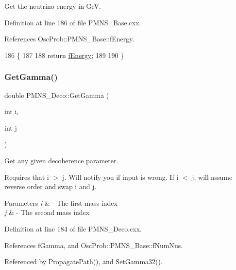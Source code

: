 Get the neutrino energy in GeV. 

Definition at line 186 of file P\+M\+N\+S\+\_\+\+Base.\+cxx.



References Osc\+Prob\+::\+P\+M\+N\+S\+\_\+\+Base\+::f\+Energy.


\begin{DoxyCode}
186                             \{
187 
188   \textcolor{keywordflow}{return} \hyperlink{classOscProb_1_1PMNS__Base_a2800af6d436972f3e900867790c046b0}{fEnergy};
189 
190 \}
\end{DoxyCode}
\mbox{\label{classOscProb_1_1PMNS__Deco_a73461e806063588a8e3a9d5d0dd201cb}} 
\subsubsection{\texorpdfstring{Get\+Gamma()}{GetGamma()}}
{\footnotesize\ttfamily double P\+M\+N\+S\+\_\+\+Deco\+::\+Get\+Gamma (\begin{DoxyParamCaption}\item[{int}]{i,  }\item[{int}]{j }\end{DoxyParamCaption})\hspace{0.3cm}{\ttfamily [virtual]}}

Get any given decoherence parameter.

Requires that i $>$ j. Will notify you if input is wrong. If i $<$ j, will assume reverse order and swap i and j.


\begin{DoxyParams}{Parameters}
{\em i} & -\/ The first mass index \\
\hline
{\em j} & -\/ The second mass index \\
\hline
\end{DoxyParams}


Definition at line 184 of file P\+M\+N\+S\+\_\+\+Deco.\+cxx.



References f\+Gamma, and Osc\+Prob\+::\+P\+M\+N\+S\+\_\+\+Base\+::f\+Num\+Nus.



Referenced by Propagate\+Path(), and Set\+Gamma32().


